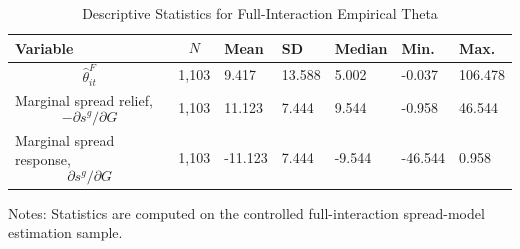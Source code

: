\begin{table}[H]\centering
\begin{threeparttable}
\caption{Descriptive Statistics for Full-Interaction Empirical Theta}
\label{tab:theta_descriptive_stats}
\scriptsize
\begin{tabularx}{\textwidth}{lYYYYYY}
\toprule
Variable & $$N$$ & Mean & SD & Median & Min. & Max. \\
\midrule
$$\widehat{\theta}^{F}_{it}$$ & 1,103 & 9.417 & 13.588 & 5.002 & -0.037 & 106.478 \\
Marginal spread relief, $$-\partial s^g/\partial G$$ & 1,103 & 11.123 & 7.444 & 9.544 & -0.958 & 46.544 \\
Marginal spread response, $$\partial s^g/\partial G$$ & 1,103 & -11.123 & 7.444 & -9.544 & -46.544 & 0.958 \\
\bottomrule
\end{tabularx}
\begin{tablenotes}[flushleft]\footnotesize
\item Notes: Statistics are computed on the controlled full-interaction spread-model estimation sample.
\end{tablenotes}
\end{threeparttable}
\end{table}
